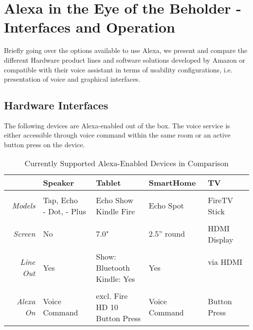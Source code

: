 
\section[Alexa in the Eye of the Beholder]{Alexa in the Eye of the Beholder - \\Interfaces and Operation}

Briefly going over the options available to use Alexa, we present and compare the different Hardware product lines and software solutions developed by Amazon or compatible with their voice assistant in terms of usability configurations, i.e. presentation of voice and graphical interfaces.

\subsection*{Hardware Interfaces}

The following devices are Alexa-enabled out of the box. The voice service is either accessible through voice command within the same room or an active button press on the device.

\begin{table}[htbp!]
	\caption[Alexa Devices in Comparision]{Currently Supported Alexa-Enabled Devices in Comparison}\label{alexaDeviceTable}
	\begin{tabularx}{\textwidth}{  r | l l l l  }
		
				& Speaker							& Tablet	& SmartHome	& TV	\\ \hline \hline \\
		\textit{Models}	& \shortstack[l]{Tap, Echo \\ - Dot, - Plus}     & \shortstack[l]{Echo Show \\ Kindle Fire}    & Echo Spot & FireTV Stick \\ \hline \\
		\textit{Screen}  		& No      & 7.0" 		& 2.5'' round				&  HDMI Display      \\ \hline \\
		\textit{Line Out}		& Yes      					        & \shortstack[l]{Show: Bluetooth \\ Kindle: Yes} & 	Yes & \shortstack{via HDMI \\ \textcolor{white}{text} }      \\ \hline \\
		\textit{Alexa On} 	& Voice	Command					&
		\shortstack[l]{excl. Fire HD 10\\Button Press}
		& Voice Command & %
		Button Press
	\end{tabularx}
\end{table}

